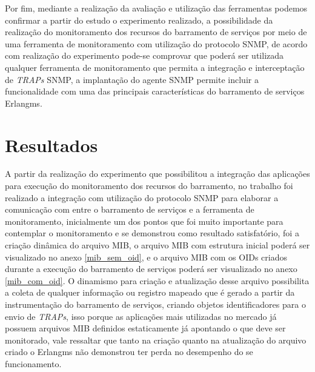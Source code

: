 Por fim, mediante a realização da avaliação e utilização das ferramentas podemos confirmar a partir do estudo o experimento realizado, a possibilidade da realização do monitoramento dos recursos do barramento de serviços por meio de uma ferramenta de monitoramento com utilização do protocolo \acrshort{SNMP}, de acordo com realização do experimento pode-se comprovar que poderá ser utilizada qualquer ferramenta de monitoramento que permita a integração e interceptação de \textit{TRAPs} \acrshort{SNMP}, a implantação do agente \acrshort{SNMP} permite incluir a funcionalidade com uma das principais características do barramento de serviços Erlangms.   



\section{Resultados}
\label{resultados}

A partir da realização do experimento que possibilitou a integração das aplicações para execução do monitoramento dos recursos do barramento, no trabalho foi realizado a integração com utilização do protocolo \acrshort{SNMP} para elaborar a comunicação com entre o barramento de serviços e a ferramenta de monitoramento, inicialmente um dos pontos que foi muito importante para contemplar o monitoramento e se demonstrou como resultado satisfatório, foi a criação dinâmica do arquivo MIB, o arquivo MIB com estrutura inicial poderá ser visualizado no anexo \ref{mib_sem_oid}, e o arquivo MIB com os \acrshort{OID}s criados durante a execução do barramento de serviços poderá ser visualizado no anexo \ref{mib_com_oid}. O dinamismo para criação e atualização desse arquivo possibilita a coleta de qualquer informação ou registro mapeado que é gerado a partir da instrumentação do barramento de serviços, criando objetos identificadores para o envio de \textit{TRAPs}, isso porque as aplicações mais utilizadas no mercado já possuem arquivos MIB definidos estaticamente já apontando o que deve ser monitorado, vale ressaltar que tanto na criação quanto na atualização do arquivo criado o Erlangms não demonstrou ter perda no desempenho do se funcionamento.

